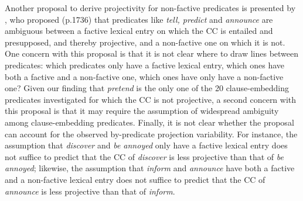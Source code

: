 \documentclass[11pt,fleqn]{article}
\newcommand{\6}{\mbox{$[\hspace*{-.6mm}[$}}
\newcommand{\9}{\mbox{$]\hspace*{-.6mm}]$}}
\begin{document}
{\begin{itemize}
Another proposal to derive projectivity for non-factive predicates is presented by \citet{spector-egre2015}, who proposed (p.1736) that predicates like {\em tell, predict} and {\em announce}  are ambiguous between a factive lexical entry on which the CC is entailed and presupposed, and thereby projective, and a non-factive one on which it is not. One concern with this proposal is that it is not clear where to draw lines between predicates: which predicates only have a factive lexical entry, which ones have both a factive and a non-factive one, which ones have only have a non-factive one? Given our finding that {\em pretend} is the only one of the 20 clause-embedding predicates investigated for which the CC is not projective, a second concern with this proposal is that it may require the assumption of widespread ambiguity among clause-embedding predicates. Finally, it is not clear whether the proposal can account for the observed by-predicate projection variability. For instance, the assumption that {\em discover} and {\em be annoyed} only have a factive lexical entry does not suffice to predict that the CC of {\em discover} is less projective than that of {\em be annoyed}; likewise, the assumption that {\em inform} and {\em announce} have both a factive and a non-factive lexical entry does not suffice to predict that the CC of {\em announce} is less projective than that of {\em inform}.


\end{itemize}}
\end{document}
